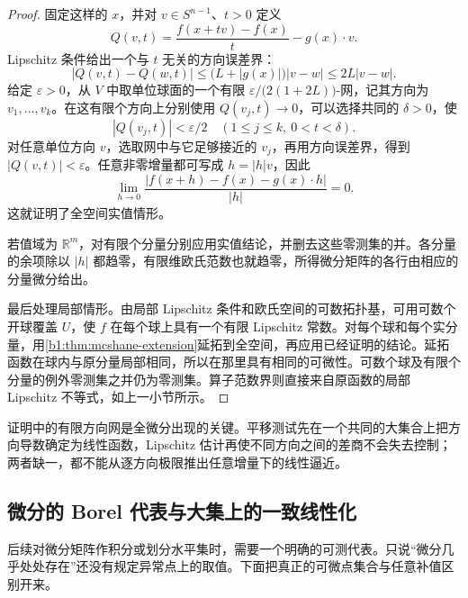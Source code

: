 \begin{proof}
固定这样的 \(x\)，并对 \(v\in S^{n-1}\)、\(t>0\) 定义
\[
 Q(v,t)=\frac{f(x+tv)-f(x)}t-g(x)\cdot v.
\]
Lipschitz 条件给出一个与 \(t\) 无关的方向误差界：
\[
 |Q(v,t)-Q(w,t)|
 \leq\bigl(L+|g(x)|\bigr)|v-w|
 \leq2L|v-w|.
\]
给定 \(\varepsilon>0\)，从 \(V\) 中取单位球面的一个有限 \(\varepsilon/\bigl(2(1+2L)\bigr)\)-网，记其方向为 \(v_1,\ldots,v_k\)。在这有限个方向上分别使用 \(Q(v_j,t)\to0\)，可以选择共同的 \(\delta>0\)，使
\[
 |Q(v_j,t)|<\varepsilon/2
 \quad(1\leq j\leq k,\ 0<t<\delta).
\]
对任意单位方向 \(v\)，选取网中与它足够接近的 \(v_j\)，再用方向误差界，得到 \(|Q(v,t)|<\varepsilon\)。任意非零增量都可写成 \(h=|h|v\)，因此
\[
 \lim_{h\to0}\frac{|f(x+h)-f(x)-g(x)\cdot h|}{|h|}=0.
\]
这就证明了全空间实值情形。

若值域为 \(\mathbb R^m\)，对有限个分量分别应用实值结论，并删去这些零测集的并。各分量的余项除以 \(|h|\) 都趋零，有限维欧氏范数也就趋零，所得微分矩阵的各行由相应的分量微分给出。

最后处理局部情形。由局部 Lipschitz 条件和欧氏空间的可数拓扑基，可用可数个开球覆盖 \(U\)，使 \(f\) 在每个球上具有一个有限 Lipschitz 常数。对每个球和每个实分量，用\cref{b1:thm:mcshane-extension}延拓到全空间，再应用已经证明的结论。延拓函数在球内与原分量局部相同，所以在那里具有相同的可微性。可数个球及有限个分量的例外零测集之并仍为零测集。算子范数界则直接来自原函数的局部 Lipschitz 不等式，如上一小节所示。
\end{proof}

证明中的有限方向网是全微分出现的关键。平移测试先在一个共同的大集合上把方向导数确定为线性函数，Lipschitz 估计再使不同方向之间的差商不会失去控制；两者缺一，都不能从逐方向极限推出任意增量下的线性逼近。

\subsection{微分的 Borel 代表与大集上的一致线性化}
\label{b1:subsec:160204}

后续对微分矩阵作积分或划分水平集时，需要一个明确的可测代表。只说“微分几乎处处存在”还没有规定异常点上的取值。下面把真正的可微点集合与任意补值区别开来。

